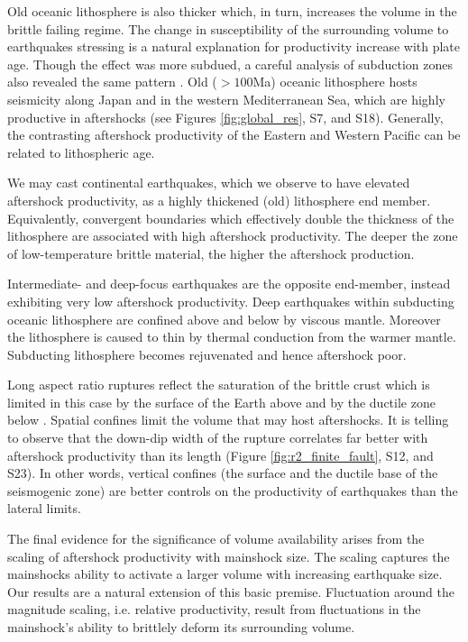 \documentclass[draft, jgrga]{agujournal2018}
\begin{document}
Old oceanic lithosphere is also thicker which, in turn, increases the volume in the brittle failing regime. The change in susceptibility of the surrounding volume to earthquakes stressing is a natural explanation for productivity increase with plate age. Though the effect was more subdued, a careful analysis of subduction zones also revealed the same pattern \citep[Appendix of][]{Wetzler2016}. Old ($>100$Ma) oceanic lithosphere hosts seismicity along Japan and in the western Mediterranean Sea, which are highly productive in aftershocks (see Figures \ref{fig:global_res}, S7, and S18). Generally, the contrasting aftershock productivity of the Eastern and Western Pacific can be related to lithospheric age.

We may cast continental earthquakes, which we observe to have elevated aftershock productivity, as a highly thickened (old) lithosphere end member. Equivalently, convergent boundaries which effectively double the thickness of the lithosphere are associated with high aftershock productivity. The deeper the zone of low-temperature brittle material, the higher the aftershock production.

Intermediate- and deep-focus earthquakes are the opposite end-member, instead exhibiting very low aftershock productivity. Deep earthquakes within subducting oceanic lithosphere are confined above and below by viscous mantle. Moreover the lithosphere is caused to thin by thermal conduction from the warmer mantle. Subducting lithosphere becomes rejuvenated and hence aftershock poor.

Long aspect ratio ruptures reflect the saturation of the brittle crust which is limited in this case by the surface of the Earth above and by the ductile zone below \citep{Scholz2019}. Spatial confines limit the volume that may host aftershocks. It is telling to observe that the down-dip width of the rupture correlates far better with aftershock productivity than its length (Figure \ref{fig:r2_finite_fault}, S12, and S23). In other words, vertical confines (the surface and the ductile base of the seismogenic zone) are better controls on the productivity of earthquakes than the lateral limits.

The final evidence for the significance of volume availability arises from the scaling of aftershock productivity with mainshock size. The scaling captures the mainshocks ability to activate a larger volume with increasing earthquake size. Our results are a natural extension of this basic premise. Fluctuation around the magnitude scaling, i.e. relative productivity, result from fluctuations in the mainshock's ability to brittlely deform its surrounding volume.
\end{document}
